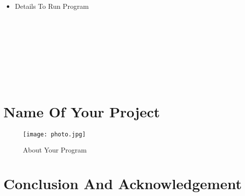 \documentclass{article}
\begin{document}
\begin{itemize}
\item Details To Run Program 

\subsection*{}\\

\subsection*{}\\

\subsection*{}\\

\end{itemize}

\newpage
\section*{Name Of Your Project}
\begin{figure}[h!]
    \centering
\texttt{[image: photo.jpg]}
    \caption{About Your Program}
    \label{fig:image1}
\end{figure}

\newpage

\section*{Conclusion And Acknowledgement}
\end{document}
